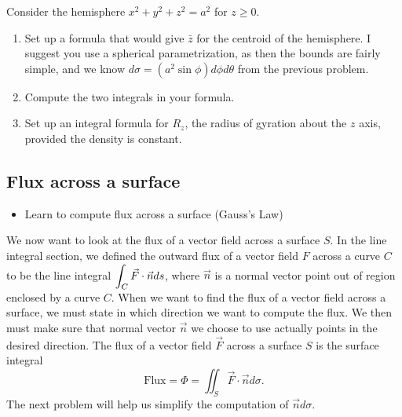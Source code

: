 \begin{problem}
 Consider the hemisphere $x^2+y^2+z^2=a^2$ for $z\geq 0$. 
\begin{enumerate}
 \item Set up a formula that would give $\bar z$ for the centroid of the hemisphere. I suggest you use a spherical parametrization, as then the bounds are fairly simple, and we know $d\sigma = (a^2\sin\phi) d\phi d\theta$ from the previous problem.
 \item Compute the two integrals in your formula. %
 \item Set up an integral formula for $R_z$, the radius of gyration about the $z$ axis, provided the density is constant.
\end{enumerate}
\end{problem}



\subsection{Flux across a surface}
\begin{itemize}
\item Learn to compute flux across a surface (Gauss's Law)
\end{itemize}


We now want to look at the flux of a vector field across a surface $S$.  In the line integral section, we defined the outward flux of a vector field $F$ across a curve $C$ to be the line integral $\displaystyle \int_C \vec F\cdot \vec n ds$, where $\vec n$ is a normal vector point out of region enclosed by a curve $C$. When we want to find the flux of a vector field across a surface, we must state in which direction we want to compute the flux. We then must make sure that normal vector $\vec n$ we choose to use actually points in the desired direction. The flux of a vector field $\vec F$ across a surface $S$ is the surface integral
$$\text{Flux}=\Phi 
= \iint_S \vec F\cdot \vec n d\sigma 
.$$
The next problem will help us simplify the computation of $\vec nd\sigma$.

